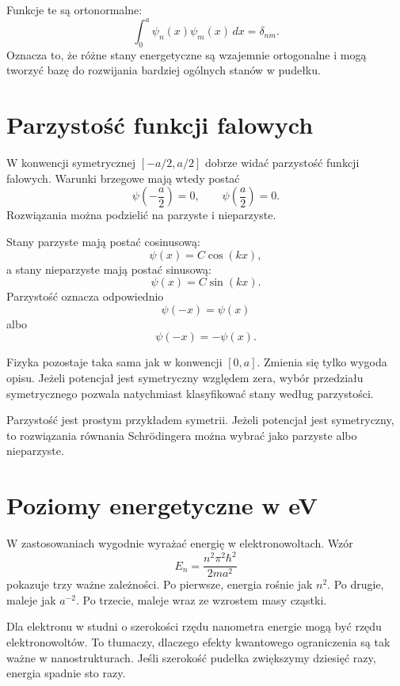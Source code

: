 Funkcje te są ortonormalne:
\begin{equation}
\int_0^a \psi_n(x)\psi_m(x)\,dx=\delta_{nm}.
\end{equation}
Oznacza to, że różne stany energetyczne są wzajemnie ortogonalne i mogą tworzyć bazę do rozwijania bardziej ogólnych stanów w pudełku.

\section{Parzystość funkcji falowych}

W konwencji symetrycznej \([-a/2,a/2]\) dobrze widać parzystość funkcji falowych. Warunki brzegowe mają wtedy postać
\[
\psi\left(-\frac{a}{2}\right)=0,
\qquad
\psi\left(\frac{a}{2}\right)=0.
\]
Rozwiązania można podzielić na parzyste i nieparzyste.

Stany parzyste mają postać cosinusową:
\begin{equation}
\psi(x)=C\cos(kx),
\end{equation}
a stany nieparzyste mają postać sinusową:
\begin{equation}
\psi(x)=C\sin(kx).
\end{equation}
Parzystość oznacza odpowiednio
\[
\psi(-x)=\psi(x)
\]
albo
\[
\psi(-x)=-\psi(x).
\]

Fizyka pozostaje taka sama jak w konwencji \([0,a]\). Zmienia się tylko wygoda opisu. Jeżeli potencjał jest symetryczny względem zera, wybór przedziału symetrycznego pozwala natychmiast klasyfikować stany według parzystości.

\begin{remarkbox}
Parzystość jest prostym przykładem symetrii. Jeżeli potencjał jest symetryczny, to rozwiązania równania Schrödingera można wybrać jako parzyste albo nieparzyste.
\end{remarkbox}

\section{Poziomy energetyczne w eV}

W zastosowaniach wygodnie wyrażać energię w elektronowoltach. Wzór
\[
E_n=\frac{n^2\pi^2\hbar^2}{2ma^2}
\]
pokazuje trzy ważne zależności. Po pierwsze, energia rośnie jak \(n^2\). Po drugie, maleje jak \(a^{-2}\). Po trzecie, maleje wraz ze wzrostem masy cząstki.

Dla elektronu w studni o szerokości rzędu nanometra energie mogą być rzędu elektronowoltów. To tłumaczy, dlaczego efekty kwantowego ograniczenia są tak ważne w nanostrukturach. Jeśli szerokość pudełka zwiększymy dziesięć razy, energia spadnie sto razy.

